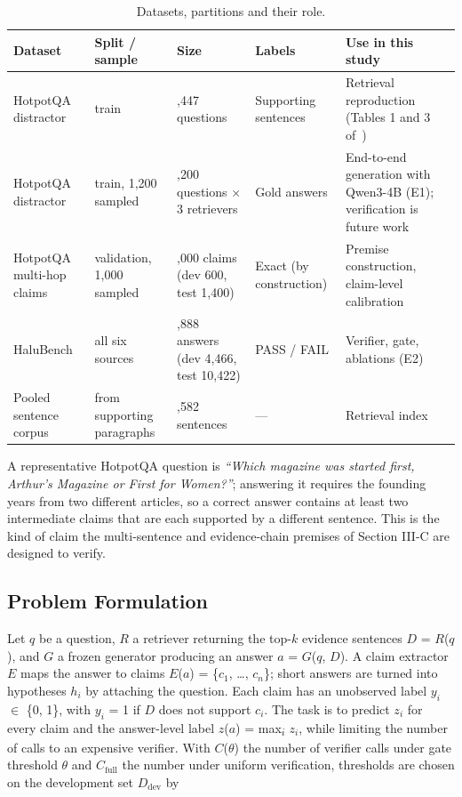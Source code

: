 \documentclass[conference]{IEEEtran}
\begin{document}
\begin{table}[t]
\centering
\caption{Datasets, partitions and their role.}
\label{tab:t2}
\footnotesize
\setlength{\tabcolsep}{3pt}
\renewcommand{\arraystretch}{1.12}
\begin{tabularx}{\textwidth}{>{\raggedright\arraybackslash\hsize=1.000\hsize}X>{\raggedright\arraybackslash\hsize=0.833\hsize}X>{\raggedright\arraybackslash\hsize=0.750\hsize}X>{\raggedright\arraybackslash\hsize=0.722\hsize}X>{\raggedright\arraybackslash\hsize=1.694\hsize}X}
\toprule
\textbf{Dataset} & \textbf{Split / sample} & \textbf{Size} & \textbf{Labels} & \textbf{Use in this study} \\
\midrule
HotpotQA distractor~\cite{yang_hotpot} & train & 90,447 questions & Supporting sentences & Retrieval reproduction (Tables 1 and 3 of~\cite{mala_ml}) \\
HotpotQA distractor~\cite{yang_hotpot} & train, 1,200 sampled & 1,200 questions $\times$ 3 retrievers & Gold answers & End-to-end generation with Qwen3-4B (E1); verification is future work \\
HotpotQA multi-hop claims & validation, 1,000 sampled & 2,000 claims (dev 600, test 1,400) & Exact (by construction) & Premise construction, claim-level calibration \\
HaluBench & all six sources & 14,888 answers (dev 4,466, test 10,422) & PASS / FAIL & Verifier, gate, ablations (E2) \\
Pooled sentence corpus & from supporting paragraphs & 338,582 sentences & --- & Retrieval index \\
\bottomrule
\end{tabularx}
\end{table}

A representative HotpotQA question is \textit{``Which magazine was started first, Arthur's Magazine or First for Women?''}; answering it requires the founding years from two different articles, so a correct answer contains at least two intermediate claims that are each supported by a different sentence. This is the kind of claim the multi-sentence and evidence-chain premises of Section III-C are designed to verify.

\subsection{Problem Formulation}

Let $q$ be a question, $R$ a retriever returning the top-$k$ evidence sentences $D$ = $R$($q$), and $G$ a frozen generator producing an answer $a$ = $G$($q$, $D$). A claim extractor $E$ maps the answer to claims $E$($a$) = \{$c_{1}$, \ldots{}, $c_{n}$\}; short answers are turned into hypotheses $h_{i}$ by attaching the question. Each claim has an unobserved label $y_{i}$ $\in$ \{0, 1\}, with $y_{i}$ = 1 if $D$ does not support $c_{i}$. The task is to predict $z_{i}$ for every claim and the answer-level label $z$($a$) = max\textsubscript{$i$} $z_{i}$, while limiting the number of calls to an expensive verifier. With $C$($\theta$) the number of verifier calls under gate threshold $\theta$ and $C_{\mathrm{full}}$ the number under uniform verification, thresholds are chosen on the development set $D_{\mathrm{dev}}$ by
\end{document}
